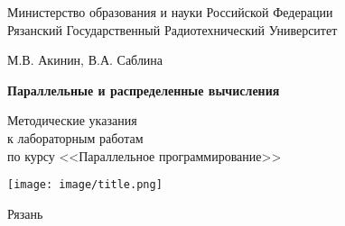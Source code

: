 
\begin{titlepage}

\begin{center}

Министерство образования и науки Российской Федерации \\
Рязанский Государственный Радиотехнический Университет

\vspace{7em}

М.В. Акинин, В.А. Саблина

\vspace{3em}

{\Large \bf Параллельные и распределенные вычисления}

\vspace{3em}

Методические указания\\
к лабораторным работам\\
по курсу <<Параллельное программирование>>

\vfill

\texttt{[image: image/title.png]}

\vfill

Рязань \the\year

\end{center}

\thispagestyle{empty}

\end{titlepage}

\setcounter{page}{2}

\clearpage

